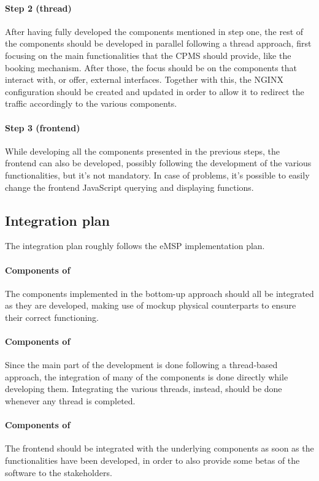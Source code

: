 \paragraph{Step 2 (thread)}\label{cpms:thread} After having fully developed the components mentioned in step one, the rest of the components should be developed in parallel following a thread approach, first focusing on the main functionalities that the CPMS should provide, like the booking mechanism. After those, the focus should be on the components that interact with, or offer, external interfaces. Together with this, the NGINX configuration should be created and updated in order to allow it to redirect the traffic accordingly to the various components.

\paragraph{Step 3 (frontend)}\label{cpms:frontend} While developing all the components presented in the previous steps, the frontend can also be developed, possibly following the development of the various functionalities, but it's not mandatory. In case of problems, it's possible to easily change the frontend JavaScript querying and displaying functions.

\subsection{Integration plan}

The integration plan roughly follows the eMSP implementation plan.

\paragraph{Components of } The components implemented in the bottom-up approach should all be integrated as they are developed, making use of mockup physical counterparts to ensure their correct functioning.

\paragraph{Components of } Since the main part of the development is done following a thread-based approach, the integration of many of the components is done directly while developing them. Integrating the various threads, instead, should be done whenever any thread is completed.

\paragraph{Components of } The frontend should be integrated with the underlying components as soon as the functionalities have been developed, in order to also provide some betas of the software to the stakeholders.

